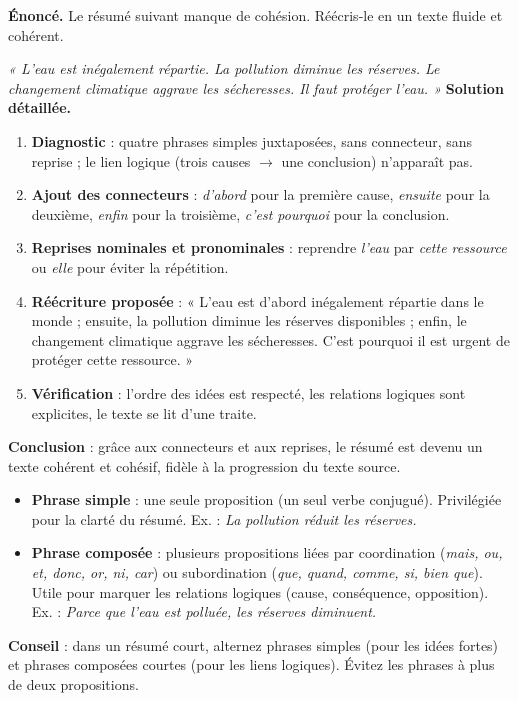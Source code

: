 \documentclass[11pt]{article}
\begin{document}
\begin{exoresolu}
\textbf{Énoncé.} Le résumé suivant manque de cohésion. Réécris-le en un texte fluide et cohérent.

\emph{« L'eau est inégalement répartie. La pollution diminue les réserves. Le changement climatique aggrave les sécheresses. Il faut protéger l'eau. »}
\tcblower
\textbf{Solution détaillée.}
\begin{enumerate}
\item \textbf{Diagnostic} : quatre phrases simples juxtaposées, sans connecteur, sans reprise ; le lien logique (trois causes $\rightarrow$ une conclusion) n'apparaît pas.
\item \textbf{Ajout des connecteurs} : \emph{d'abord} pour la première cause, \emph{ensuite} pour la deuxième, \emph{enfin} pour la troisième, \emph{c'est pourquoi} pour la conclusion.
\item \textbf{Reprises nominales et pronominales} : reprendre \emph{l'eau} par \emph{cette ressource} ou \emph{elle} pour éviter la répétition.
\item \textbf{Réécriture proposée} : « L'eau est d'abord inégalement répartie dans le monde ; ensuite, la pollution diminue les réserves disponibles ; enfin, le changement climatique aggrave les sécheresses. C'est pourquoi il est urgent de protéger cette ressource. »
\item \textbf{Vérification} : l'ordre des idées est respecté, les relations logiques sont explicites, le texte se lit d'une traite.
\end{enumerate}
\textbf{Conclusion} : grâce aux connecteurs et aux reprises, le résumé est devenu un texte cohérent et cohésif, fidèle à la progression du texte source.
\end{exoresolu}

\begin{propriete}
\begin{itemize}
\item \textbf{Phrase simple} : une seule proposition (un seul verbe conjugué). Privilégiée pour la clarté du résumé. Ex. : \emph{La pollution réduit les réserves.}
\item \textbf{Phrase composée} : plusieurs propositions liées par coordination (\emph{mais, ou, et, donc, or, ni, car}) ou subordination (\emph{que, quand, comme, si, bien que}). Utile pour marquer les relations logiques (cause, conséquence, opposition). Ex. : \emph{Parce que l'eau est polluée, les réserves diminuent.}
\end{itemize}
\textbf{Conseil} : dans un résumé court, alternez phrases simples (pour les idées fortes) et phrases composées courtes (pour les liens logiques). Évitez les phrases à plus de deux propositions.
\end{propriete}
\end{document}
